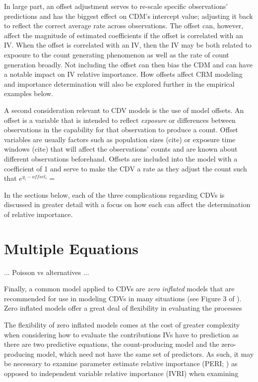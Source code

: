 \documentclass[ShortAfour,times,sageapa]{sagej}
\begin{document}
	In large part, an offset adjustment serves to re-scale specific observations' predictions and has the biggest effect on CDM's intercept value; adjusting it back to reflect the correct average rate across observations.
	The offset can, however, affect the magnitude of estimated coefficients if the offset is correlated with an IV.  
	When the offset is correlated with an IV, then the IV may be both related to exposure to the count generating phenomenon as well as the rate of count generation broadly.
	Not including the offset can then bias the CDM and can have a notable impact on IV relative importance.
	How offsets affect CRM modeling and importance determination will also be explored further in the empirical examples below.
	
	A second consideration relevant to CDV models is the use of model offsets.  An offset is a variable that is intended to reflect \emph{exposure} or differences between observations in the capability for that observation to produce a count.  Offset variables are usually factors such as population sizes (cite) or exposure time windows (cite) that will affect the observations' counts and are known about different observations beforehand.  Offsets are included into the model with a coefficient of 1 and serve to make the CDV a rate as they adjust the count such that $e^{y_{i} - offset_{i}} = $
	
	
	
	In the sections below, each of the three complications regarding CDVs is discussed in greater detail with a focus on how each can affect the determination of relative importance.
	
\section{Multiple Equations}
	
	... Poisson vs alternatives ...
		
	Finally, a common model applied to CDVs are \emph{zero inflated} models that are recommended for use in modeling CDVs in many situations (see Figure 3 of \cite{blevins2015count}).  Zero inflated models offer a great deal of flexibility in evaluating the processes
	
	The flexibility of zero inflated models comes at the cost of greater complexity when considering how to evaluate the contributions IVs have to prediction as there are two predictive equations, the count-producing model and the zero-producing model, which need not have the same set of predictors.  As such, it may be necessary to examine parameter estimate relative importance (PERI; \cite{luchman2020relative}) as opposed to independent variable relative importance (IVRI) when examining 
\end{document}

